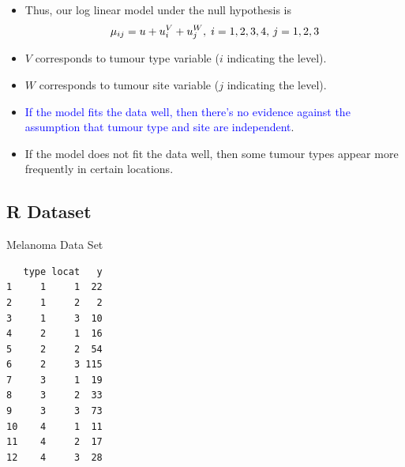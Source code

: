 \documentclass{article}\usepackage[]{graphicx}\usepackage[svgnames]{xcolor}
\makeatletter
\newenvironment{kframe}{%
 \def\at@end@of@kframe{}%
 \ifinner\ifhmode%
  \def\at@end@of@kframe{\end{minipage}}%
  \begin{minipage}{\columnwidth}%
 \fi\fi%
 \def\FrameCommand##1{\hskip\@totalleftmargin \hskip-\fboxsep
 \colorbox{shadecolor}{##1}\hskip-\fboxsep
     \hskip-\linewidth \hskip-\@totalleftmargin \hskip\columnwidth}%
 \MakeFramed {\advance\hsize-\width
   \@totalleftmargin\z@ \linewidth\hsize
   \@setminipage}}%
 {\par\unskip\endMakeFramed%
 \at@end@of@kframe}
\newenvironment{knitrout}{}{} %
\let\log\relax%
\makeatother
\begin{document}
\begin{itemize}
    \item Thus, our log linear model under the null hypothesis is
          \[ \log{\mu_{ij}}=u+u_i^V+u_j^W,\; i=1,2,3,4,\,j=1,2,3 \]
    \item $V$ corresponds to tumour type variable ($i$ indicating the level).
    \item $W$ corresponds to tumour site variable ($j$ indicating the level).
    \item \textcolor{Blue}{If the model fits the data well, then there's no evidence against the assumption
              that tumour type and site are independent}.
    \item If the model does not fit the data well, then some tumour types appear more
          frequently in certain locations.
\end{itemize}
\subsection*{R Dataset}
\begin{Example}{Melanoma Data Set}
\begin{knitrout}
\color{fgcolor}\begin{kframe}
\begin{verbatim}
   type locat   y
1     1     1  22
2     1     2   2
3     1     3  10
4     2     1  16
5     2     2  54
6     2     3 115
7     3     1  19
8     3     2  33
9     3     3  73
10    4     1  11
11    4     2  17
12    4     3  28
\end{verbatim}
\end{kframe}
\end{knitrout}
\end{Example}
\end{document}
